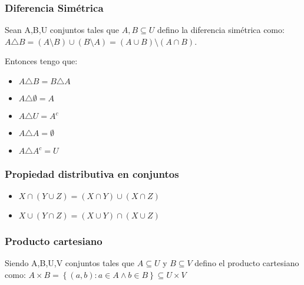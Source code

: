 \documentclass{report}
\begin{document}
\subsubsection{Diferencia Simétrica}
Sean A,B,U conjuntos tales que $A,B \subseteq U$ defino la diferencia simétrica como: \begin{math}
    A \triangle B = (A \setminus B) \cup (B \setminus A) = (A \cup B) \setminus (A \cap B) 
\end{math}. 

Entonces tengo que: \begin{itemize}
    \item $A\triangle B = B \triangle A$
    \item $A \triangle \emptyset = A$
    \item $A\triangle U = A^c$
    \item $A\triangle A = \emptyset$
    \item $A \triangle A^c = U$
\end{itemize}

\subsubsection{Propiedad distributiva en conjuntos}
\begin{itemize}
    \item \begin{math}
        X \cap (Y \cup Z) = (X \cap Y) \cup (X \cap Z) 
    \end{math}
    \item \begin{math}
        X \cup (Y \cap Z) = (X \cup Y) \cap (X \cup Z)
    \end{math}
\end{itemize}

\subsubsection{Producto cartesiano}
Siendo A,B,U,V conjuntos tales que $A \subseteq U$ y $B \subseteq V$ defino el producto cartesiano como: \begin{math}
    A \times B = \left\{(a,b): a\in A \land b\in B\right\} \subseteq U\times V
\end{math}
\end{document}
